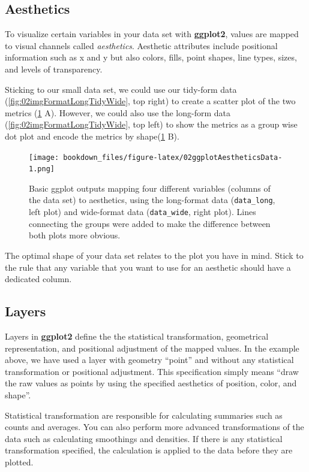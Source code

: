 \documentclass[
]{krantz}
\begin{document}
\hypertarget{aesthetics}{%
\subsection{Aesthetics}\label{aesthetics}}

To visualize certain variables in your data set with \textbf{ggplot2}, values are mapped to visual channels called \emph{aesthetics}. Aesthetic attributes include positional information such as x and y but also colors, fills, point shapes, line types, sizes, and levels of transparency.

Sticking to our small data set, we could use our tidy-form data (\ref{fig:02imgFormatLongTidyWide}, top right) to create a scatter plot of the two metrics (\ref{fig:02ggplotAestheticsData} A). However, we could also use the long-form data (\ref{fig:02imgFormatLongTidyWide}, top left) to show the metrics as a group wise dot plot and encode the metrics by shape(\ref{fig:02ggplotAestheticsData} B).

\begin{figure}
\centering
\texttt{[image: bookdown\_files/figure-latex/02ggplotAestheticsData-1.png]}
\caption{\label{fig:02ggplotAestheticsData}Basic ggplot outputs mapping four different variables (columns of the data set) to aesthetics, using the long-format data (\texttt{data\_long}, left plot) and wide-format data (\texttt{data\_wide}, right plot). Lines connecting the groups were added to make the difference between both plots more obvious.}
\end{figure}

The optimal shape of your data set relates to the plot you have in mind. Stick to the rule that any variable that you want to use for an aesthetic should have a dedicated column.

\hypertarget{layers}{%
\subsection{Layers}\label{layers}}

Layers in \textbf{ggplot2} define the the statistical transformation, geometrical representation, and positional adjustment of the mapped values. In the example above, we have used a layer with geometry ``point'' and without any statistical transformation or positional adjustment. This specification simply means ``draw the raw values as points by using the specified aesthetics of position, color, and shape''.

Statistical transformation are responsible for calculating summaries such as counts and averages. You can also perform more advanced transformations of the data such as calculating smoothings and densities. If there is any statistical transformation specified, the calculation is applied to the data before they are plotted.
\end{document}

